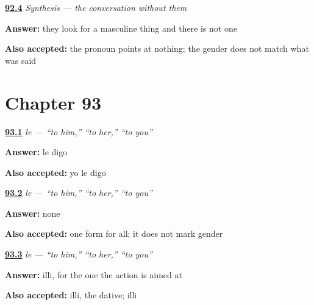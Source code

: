 \noindent\begin{minipage}[t]{\linewidth}
\raggedright
\hyperlink{review-ES-C45-sintesis-sin-repetir-cost}{\textbf{92.4}} \emph{Synthesis — the conversation without them}\par
\small \textbf{Answer:} they look for a masculine thing and there is not one\par
\footnotesize \textbf{Also accepted:} the pronoun points at nothing; the gender does not match what was said
\end{minipage}\par\medskip

\section*{Chapter 93}

\noindent\begin{minipage}[t]{\linewidth}
\raggedright
\hyperlink{review-ES-C46-le-say}{\textbf{93.1}} \emph{le — \textquotedblleft{}to him,\textquotedblright{} \textquotedblleft{}to her,\textquotedblright{} \textquotedblleft{}to you\textquotedblright{}}\par
\small \textbf{Answer:} le digo\par
\footnotesize \textbf{Also accepted:} yo le digo
\end{minipage}\par\medskip

\noindent\begin{minipage}[t]{\linewidth}
\raggedright
\hyperlink{review-ES-C46-le-gender}{\textbf{93.2}} \emph{le — \textquotedblleft{}to him,\textquotedblright{} \textquotedblleft{}to her,\textquotedblright{} \textquotedblleft{}to you\textquotedblright{}}\par
\small \textbf{Answer:} none\par
\footnotesize \textbf{Also accepted:} one form for all; it does not mark gender
\end{minipage}\par\medskip

\noindent\begin{minipage}[t]{\linewidth}
\raggedright
\hyperlink{review-ES-C46-le-case}{\textbf{93.3}} \emph{le — \textquotedblleft{}to him,\textquotedblright{} \textquotedblleft{}to her,\textquotedblright{} \textquotedblleft{}to you\textquotedblright{}}\par
\small \textbf{Answer:} illi, for the one the action is aimed at\par
\footnotesize \textbf{Also accepted:} illi, the dative; illi
\end{minipage}\par\medskip


